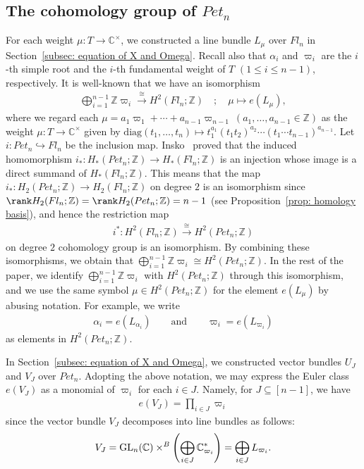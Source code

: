 \subsection{The cohomology group of \texorpdfstring{$Pet_{n}$}{Petn}}
For each weight $\mu\colon T\rightarrow {\mathbb C}^{\times}$, we constructed a line bundle $L_{\mu}$ over $Fl_n$ in Section~\ref{subsec: equation of X and Omega}.
Recall also that $\alpha_i$ and $\varpi_i$ are the $i$-th simple root and the $i$-th fundamental weight of $T$ $(1\le i\le n-1)$, respectively.
It is well-known that we have an isomorphism
\begin{align*}
\bigoplus_{i=1}^{n-1} {\mathbb Z}\varpi_i
\stackrel{\cong}{\rightarrow} H^2(Fl_n;{\mathbb Z}) 
\quad ; \quad
\mu \mapsto e(L_{\mu}),
\end{align*}
where we regard each $\mu=a_1\varpi_1+\cdots+a_{n-1}\varpi_{n-1}\ (a_1,\ldots,a_{n-1}\in{\mathbb Z})$ as the weight $\mu\colon T\rightarrow {\mathbb C}^{\times}$ given by $\text{diag}(t_1,\ldots,t_n)\mapsto t_1^{a_1}(t_1t_2)^{a_2}\cdots(t_1\cdots t_{n-1})^{a_{n-1}}$.
Let~$i\colon Pet_{n}\hookrightarrow Fl_n$ be the inclusion map. Insko~\cite{Insko} proved that the induced homomorphism $i_*\colon H_*(Pet_{n};{\mathbb Z})\rightarrow H_*(Fl_n;{\mathbb Z})$ is an injection whose image is a direct summand of $H_*(Fl_n;{\mathbb Z})$. This means that the map $i_*\colon H_2(Pet_{n};{\mathbb Z}) \rightarrow H_2(Fl_n;{\mathbb Z})$ on degree $2$ is an isomorphism since $\rank H_2(Fl_n;{\mathbb Z})=\rank H_2(Pet_{n};{\mathbb Z}) =n-1$ (see Proposition~\ref{prop: homology basis}), and hence the restriction map 
\begin{align*}
i^*\colon H^2(Fl_n;{\mathbb Z})  \stackrel{\cong}{\rightarrow} H^2(Pet_{n};{\mathbb Z}) 
\end{align*}
on degree $2$ cohomology group is an isomorphism. By combining these isomorphisms, we obtain that $\bigoplus_{i=1}^{n-1} {\mathbb Z}\varpi_i\cong H^2(Pet_{n};{\mathbb Z})$. In the rest of the paper, we identify $\bigoplus_{i=1}^{n-1} {\mathbb Z}\varpi_i$ with $H^2(Pet_{n};{\mathbb Z})$ through this isomorphism, and we use the same symbol $\mu\in H^2(Pet_{n};{\mathbb Z})$ for the element  $e(L_{\mu})$ by abusing notation. For example, we write
\begin{align*}
\alpha_i = e(L_{\alpha_i})
\qquad \text{and} \qquad
\varpi_i = e(L_{\varpi_i})
\end{align*}
as elements in $ H^2(Pet_{n};{\mathbb Z})$.

In Section~\ref{subsec: equation of X and Omega}, we constructed vector bundles $U_J$ and $V_{J}$ over $Pet_{n}$. Adopting the above notation, we may express the Euler class $e(V_J)$ as a monomial of $\varpi_i$ for each $i\in J$. Namely, for $J\subseteq[n-1]$, we have
\begin{align}\label{eq: monomial exp of e(VJ)}
e(V_J) = \prod_{i\in J} \varpi_i
\end{align}
since the vector bundle $V_{J}$ decomposes into line bundles as follows:
\begin{align*}
V_{J} 
= {\rm GL}_n({\mathbb C})\times^B \left(\bigoplus_{i\in J} {\mathbb C}_{\varpi_i}^*\right)
= \bigoplus_{i\in J} L_{\varpi_i}.
\end{align*}

